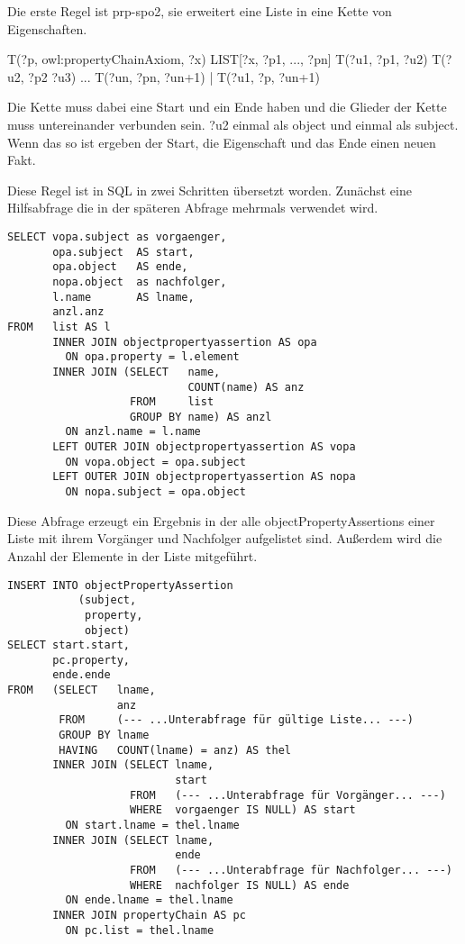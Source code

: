 Die erste Regel ist prp-spo2, sie erweitert eine Liste in eine Kette von Eigenschaften.

T(?p, owl:propertyChainAxiom, ?x)
LIST[?x, ?p1, ..., ?pn]
T(?u1, ?p1, ?u2)
T(?u2, ?p2 ?u3)
...
T(?un, ?pn, ?un+1) 	                      | T(?u1, ?p, ?un+1)

Die Kette muss dabei eine Start und ein Ende haben und die Glieder der Kette muss untereinander verbunden sein. ?u2 einmal als object und einmal als subject. Wenn das so ist ergeben der Start, die Eigenschaft und das Ende einen neuen Fakt.

Diese Regel ist in SQL in zwei Schritten übersetzt worden. Zunächst eine Hilfsabfrage die in der späteren Abfrage mehrmals verwendet wird.

\begin{lstlisting}
SELECT vopa.subject as vorgaenger,
       opa.subject  AS start,
       opa.object   AS ende,
       nopa.object  as nachfolger,
       l.name       AS lname,
       anzl.anz
FROM   list AS l
       INNER JOIN objectpropertyassertion AS opa
         ON opa.property = l.element
       INNER JOIN (SELECT   name,
                            COUNT(name) AS anz
                   FROM     list
                   GROUP BY name) AS anzl
         ON anzl.name = l.name
       LEFT OUTER JOIN objectpropertyassertion AS vopa
         ON vopa.object = opa.subject
       LEFT OUTER JOIN objectpropertyassertion AS nopa
         ON nopa.subject = opa.object
\end{lstlisting}

Diese Abfrage erzeugt ein Ergebnis in der alle objectPropertyAssertions einer Liste mit ihrem Vorgänger und Nachfolger aufgelistet sind. Außerdem wird die Anzahl der Elemente in der Liste mitgeführt.

\begin{lstlisting}
INSERT INTO objectPropertyAssertion
           (subject,
            property,
            object)
SELECT start.start,
       pc.property,
       ende.ende
FROM   (SELECT   lname,
                 anz
        FROM     (--- ...Unterabfrage für gültige Liste... ---)
        GROUP BY lname
        HAVING   COUNT(lname) = anz) AS thel
       INNER JOIN (SELECT lname,
                          start
                   FROM   (--- ...Unterabfrage für Vorgänger... ---)
                   WHERE  vorgaenger IS NULL) AS start
         ON start.lname = thel.lname
       INNER JOIN (SELECT lname,
                          ende
                   FROM   (--- ...Unterabfrage für Nachfolger... ---)
                   WHERE  nachfolger IS NULL) AS ende
         ON ende.lname = thel.lname
       INNER JOIN propertyChain AS pc
         ON pc.list = thel.lname
\end{lstlisting}

